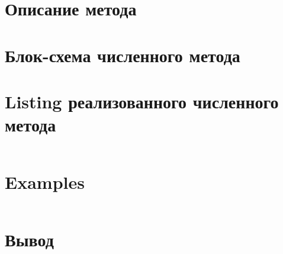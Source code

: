 \tableofcontents

\newpage



\section{Описание метода}

\section{Блок-схема численного метода}

\section{Listing реализованного численного метода}
\tiny
\begin{verbatim}
\end{verbatim}
\normalsize

\section{Examples}
\begin{verbatim}
\end{verbatim}


\section{Вывод}
